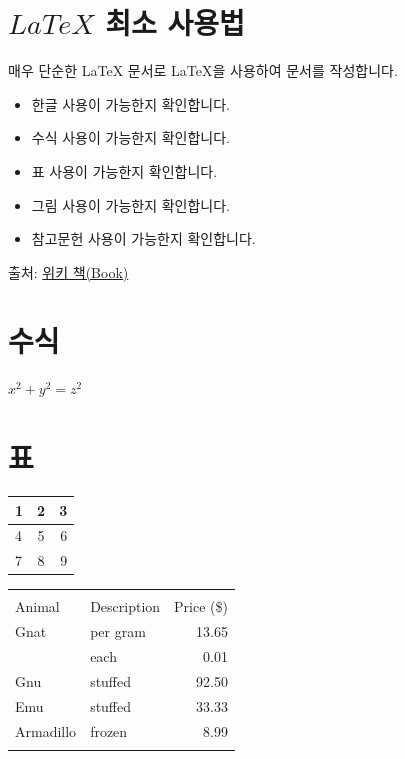 \documentclass[12pt]{article}
\begin{document}
\section{$LaTeX$ 최소 사용법}

매우 단순한 \LaTeX\/ 문서로 \LaTeX\/을 사용하여 문서를 작성합니다.

\begin{itemize}
  \item 한글 사용이 가능한지 확인합니다.
  \item 수식 사용이 가능한지 확인합니다.
  \item 표 사용이 가능한지 확인합니다.
  \item 그림 사용이 가능한지 확인합니다.
  \item 참고문헌 사용이 가능한지 확인합니다.
\end{itemize}

출처: \href{https://en.wikibooks.org/wiki/LaTeX}{위키 책(Book)}

\section{수식}

$x^2 + y^2 = z^2 $ %

\section{표}

\begin{center}
  \begin{tabular}{ l | c | r }
    \hline
    1 & 2 & 3 \\ \hline
    4 & 5 & 6 \\ \hline
    7 & 8 & 9 \\
    \hline
  \end{tabular}
\end{center}

\begin{tabular}{ | l | l | r | }
  \hline\noalign{\smallskip}
  \multicolumn{2}{c}{Item} \\
  \cline{1-2}\noalign{\smallskip}
  Animal & Description & Price (\$) \\
  \noalign{\smallskip}\hline\noalign{\smallskip}
  Gnat  & per gram & 13.65 \\
        & each     &  0.01 \\
  Gnu   & stuffed  & 92.50 \\
  Emu   & stuffed  & 33.33 \\
  Armadillo & frozen & 8.99 \\
  \noalign{\smallskip}\hline
\end{tabular}
\end{document}

